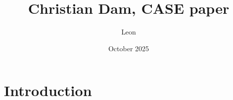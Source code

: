 \documentclass{article}
\title{Christian Dam, CASE paper}
\author{Leon }
\date{October 2025}
\begin{document}
\maketitle

\section{Introduction}
\end{document}
